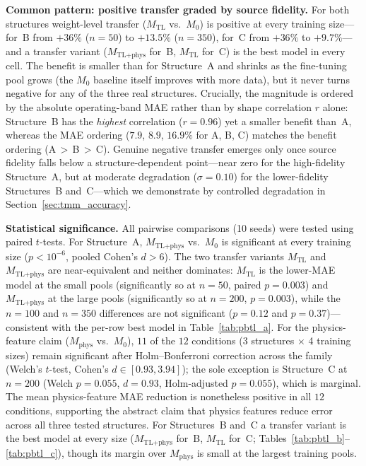 \documentclass[a4paper,fleqn]{cas-sc}
\newcommand{\Mzero}{M_0}
\newcommand{\Mphys}{M_\text{phys}}
\newcommand{\Mtl}{M_\text{TL}}
\newcommand{\Mtlphys}{M_\text{TL+phys}}
\begin{document}
\textbf{Common pattern: positive transfer graded by source fidelity.} For both structures weight-level transfer ($\Mtl$ vs.\ $\Mzero$) is positive at every training size---for~B from $+36\%$ ($n=50$) to $+13.5\%$ ($n=350$), for~C from $+36\%$ to $+9.7\%$---and a transfer variant ($\Mtlphys$ for~B, $\Mtl$ for~C) is the best model in every cell. The benefit is smaller than for Structure~A and shrinks as the fine-tuning pool grows (the $\Mzero$ baseline itself improves with more data), but it never turns negative for any of the three real structures. Crucially, the magnitude is ordered by the absolute operating-band MAE rather than by shape correlation $r$ alone: Structure~B has the \emph{highest} correlation ($r=0.96$) yet a smaller benefit than~A, whereas the MAE ordering ($7.9$, $8.9$, $16.9\%$ for A, B, C) matches the benefit ordering (A\,$>$\,B\,$>$\,C). Genuine negative transfer emerges only once source fidelity falls below a structure-dependent point---near zero for the high-fidelity Structure~A, but at moderate degradation ($\sigma=0.10$) for the lower-fidelity Structures~B and~C---which we demonstrate by controlled degradation in Section~\ref{sec:tmm_accuracy}.


\textbf{Statistical significance.} All pairwise comparisons (10 seeds) were tested using paired $t$-tests. For Structure~A, $\Mtlphys$ vs.\ $\Mzero$ is significant at every training size ($p < 10^{-6}$, pooled Cohen's $d > 6$). The two transfer variants $\Mtl$ and $\Mtlphys$ are near-equivalent and neither dominates: $\Mtl$ is the lower-MAE model at the small pools (significantly so at $n=50$, paired $p=0.003$) and $\Mtlphys$ at the large pools (significantly so at $n=200$, $p=0.003$), while the $n=100$ and $n=350$ differences are not significant ($p=0.12$ and $p=0.37$)---consistent with the per-row best model in Table~\ref{tab:pbtl_a}. For the physics-feature claim ($\Mphys$ vs.\ $\Mzero$), $11$ of the $12$ conditions (3 structures $\times$ 4 training sizes) remain significant after Holm--Bonferroni correction across the family (Welch's $t$-test, Cohen's $d \in [0.93, 3.94]$); the sole exception is Structure~C at $n=200$ (Welch $p=0.055$, $d=0.93$, Holm-adjusted $p=0.055$), which is marginal. The mean physics-feature MAE reduction is nonetheless positive in all $12$ conditions, supporting the abstract claim that physics features reduce error across all three tested structures. For Structures~B and~C a transfer variant is the best model at every size ($\Mtlphys$ for~B, $\Mtl$ for~C; Tables~\ref{tab:pbtl_b}--\ref{tab:pbtl_c}), though its margin over $\Mphys$ is small at the largest training pools.
\end{document}

